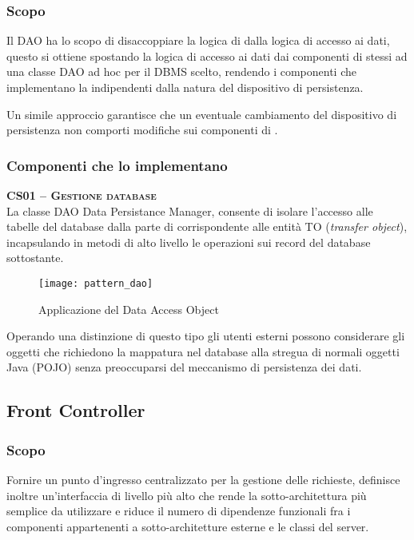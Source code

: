 \subsubsection{Scopo}
Il  DAO ha lo scopo di disaccoppiare la logica di  dalla logica di accesso ai dati, questo si ottiene spostando la logica di accesso ai dati dai componenti di  stessi ad una classe DAO ad hoc per il DBMS scelto, rendendo i componenti che implementano la  indipendenti dalla natura del dispositivo di persistenza.

Un simile approccio garantisce che un eventuale cambiamento del dispositivo di persistenza non comporti modifiche sui componenti di .

\subsubsection{Componenti che lo implementano}
\begin{description}
\item{\scshape\bfseries CS01 -- Gestione database}\\
La classe DAO Data Persistance Manager, consente di isolare l'accesso alle tabelle del database dalla parte di  corrispondente alle entità TO (\textit{transfer object}), incapsulando in metodi di alto livello le operazioni sui record del database sottostante.

\begin{figure}[H]
  \centering
  \texttt{[image: pattern\_dao]}
  \caption{Applicazione del  Data Access Object}\label{fig:dao}
\end{figure}

Operando una distinzione di questo tipo gli utenti esterni possono considerare gli oggetti che richiedono la mappatura nel database alla stregua di normali oggetti Java (POJO) senza preoccuparsi del meccanismo di persistenza dei dati.
\end{description}

\subsection{Front Controller}\label{sec:patternfacade}

\subsubsection{Scopo}
Fornire un punto d'ingresso centralizzato per la gestione delle richieste, definisce inoltre un'interfaccia di livello più alto che rende la sotto-architettura più semplice da utilizzare e riduce il numero di dipendenze funzionali fra i componenti appartenenti a sotto-architetture esterne e le classi del server.

